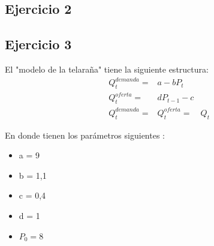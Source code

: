 \documentclass[11pt,a4paper]{article}
\begin{document}
	\subsection{Ejercicio 2}
	    
		
	\subsection{Ejercicio 3}
		El "modelo de la telaraña" tiene la siguiente estructura:
		\begin{equation}
			\begin{array}{llllll}
				&Q_t^{demanda} = & a - bP_t \\
				&Q_t^{oferta} = & dP_{t-1} - c \\
				&Q_t^{demanda} = &Q_t^{oferta}  = &Q_t
			\end{array}
		\end{equation}
		
		En donde tienen los parámetros siguientes :
		\begin{itemize}
					\item a = 9
					\item b = 1,1
					\item c = 0,4
					\item d = 1
					\item $P_0 = 8$
		\end{itemize}
\end{document}
